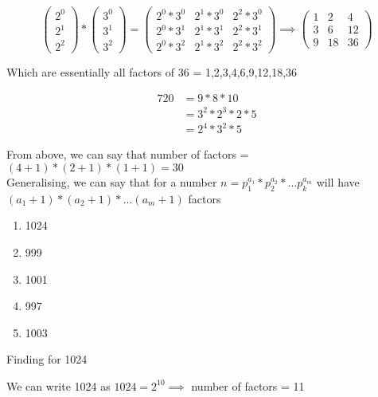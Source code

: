 $$
\begin{pmatrix}
    2^0 \\
    2^1 \\
    2^2
\end{pmatrix}
*
\begin{pmatrix}
    3^0 \\
    3^1 \\
    3^2 
\end{pmatrix}
= 
\begin{pmatrix}
    2^0 * 3^0 & 2^1 * 3^0 & 2^2 * 3^0 \\
    2^0 * 3^1 & 2^1 * 3^1 & 2^2 * 3^1 \\
    2^0 * 3^2 & 2^1 * 3^2 & 2^2 * 3^2 
\end{pmatrix}
\implies
\begin{pmatrix}
    1 & 2 & 4 \\
    3 & 6 & 12 \\
    9 & 18 & 36 
\end{pmatrix}
$$

Which are essentially all factors of 36 = 1,2,3,4,6,9,12,18,36


\begin{align*}
    720 &= 9 * 8 * 10 \\
    &= 3^2 * 2^3 * 2 * 5 \\
    &= 2^4 * 3^2 * 5
\end{align*}

From above, we can say that number of factors = $(4+1) * (2+1) * (1+1) = 30$ \\

Generalising, we can say that for a number $n = p_{1}^{a_1} * p_{2}^{a_2} * \ldots p_{k}^{a_m}$ will have $(a_1 + 1) * (a_2 + 1) * \ldots (a_m + 1)$ factors


\begin{enumerate}
    \item 1024
    \item 999
    \item 1001
    \item 997
    \item 1003
\end{enumerate}

Finding for 1024

We can write 1024 as $1024 = 2^10 \implies$ number of factors = 11 \\

